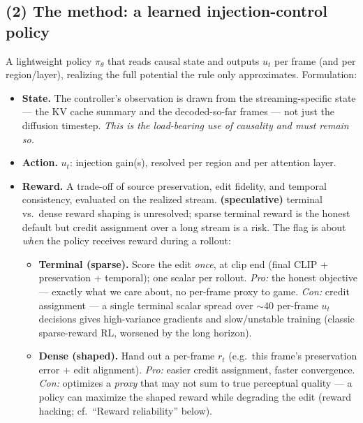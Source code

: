 \documentclass{article}
\begin{document}
\subsection*{(2) The method: a learned injection-control policy}

A lightweight policy $\pi_\theta$ that reads causal state and outputs $u_t$ per frame (and per
region/layer), realizing the full potential the rule only approximates. Formulation:
\begin{itemize}
  \item \textbf{State.} The controller's observation is drawn from the streaming-specific
        state --- the KV cache summary and the decoded-so-far frames --- not just the diffusion
        timestep. \emph{This is the load-bearing use of causality and must remain so.}
  \item \textbf{Action.} $u_t$: injection gain(s), resolved per region and per attention layer.
  \item \textbf{Reward.} A trade-off of source preservation, edit fidelity, and temporal
        consistency, evaluated on the realized stream. \textbf{(speculative)} terminal vs.\
        dense reward shaping is unresolved; sparse terminal reward is the honest default but
        credit assignment over a long stream is a risk. The flag is about \emph{when} the policy
        receives reward during a rollout:
        \begin{itemize}
          \item \textbf{Terminal (sparse).} Score the edit \emph{once}, at clip end (final
                CLIP + preservation + temporal); one scalar per rollout. \emph{Pro:} the honest
                objective --- exactly what we care about, no per-frame proxy to game.
                \emph{Con:} credit assignment --- a single terminal scalar spread over $\sim$40
                per-frame $u_t$ decisions gives high-variance gradients and slow/unstable
                training (classic sparse-reward RL, worsened by the long horizon).
          \item \textbf{Dense (shaped).} Hand out a per-frame $r_t$ (e.g.\ this frame's
                preservation error + edit alignment). \emph{Pro:} easier credit assignment,
                faster convergence. \emph{Con:} optimizes a \emph{proxy} that may not sum to
                true perceptual quality --- a policy can maximize the shaped reward while
                degrading the edit (reward hacking; cf.\ ``Reward reliability'' below).
        \end{itemize}

\end{itemize}
\end{document}
